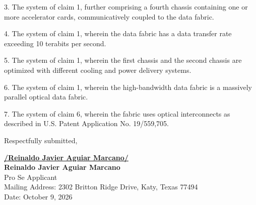 \documentclass[11pt,letterpaper]{article}
\begin{document}
3. The system of claim 1, further comprising a fourth chassis containing one or more accelerator cards, communicatively coupled to the data fabric.

4. The system of claim 1, wherein the data fabric has a data transfer rate exceeding 10 terabits per second.

5. The system of claim 1, wherein the first chassis and the second chassis are optimized with different cooling and power delivery systems.

6. The system of claim 1, wherein the high-bandwidth data fabric is a massively parallel optical data fabric.

7. The system of claim 6, wherein the fabric uses optical interconnects as described in U.S. Patent Application No. 19/559,705.

\vspace{0.3cm}
\begin{singlespace}
\noindent Respectfully submitted, \par\vspace{0.6cm}
\underline{\textbf{/Reinaldo Javier Aguiar Marcano/}} \\
\textbf{Reinaldo Javier Aguiar Marcano} \\
Pro Se Applicant \\
Mailing Address: 2302 Britton Ridge Drive, Katy, Texas 77494 \\
Date: October 9, 2026
\end{singlespace}
\end{document}
